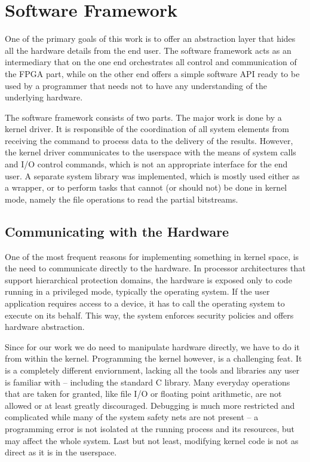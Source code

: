 \chapter{Software Framework}

One of the primary goals of this work is to offer an abstraction layer that hides
all the hardware details from the end user. The software framework acts as an intermediary
that on the one end orchestrates all control and communication of the FPGA part, while
on the other end offers a simple software API ready to be used by a programmer that needs not
to have any understanding of the underlying hardware.

The software framework consists of two parts. The major work is done by a kernel driver.
It is responsible of the coordination of all system elements from receiving the command
to process data to the delivery of the results. However, the kernel driver communicates
to the userspace with the means of system calls and I/O control commands, which is not
an appropriate interface for the end user. A separate system library was implemented,
which is mostly used either as a wrapper, or to perform tasks that cannot (or should not)
be done in kernel mode, namely the file operations to read the partial bitstreams.

\section{Communicating with the Hardware}

One of the most frequent reasons for implementing something in kernel space,
is the need to communicate directly to the hardware. In processor architectures
that support hierarchical protection domains, the hardware is exposed only to
code running in a privileged mode, typically the operating system.
If the user application requires access to a device, it has to call the operating
system to execute on its behalf. This way, the system enforces security policies
and offers hardware abstraction. 

Since for our work we do need to manipulate hardware directly, we have to do it from
within the kernel. Programming the kernel however, is a challenging feat.
It is a completely different enviornment, lacking all the tools and libraries any
user is familiar with -- including the standard C library. Many everyday operations
that are taken for granted, like file I/O or floating point arithmetic,
are not allowed or at least greatly discouraged. Debugging is much more restricted
and complicated while many of the system safety nets are not present -- a programming
error is not isolated at the running process and its resources, but may affect the whole system.
Last but not least, modifying kernel code is not as direct as it is in the userspace.

